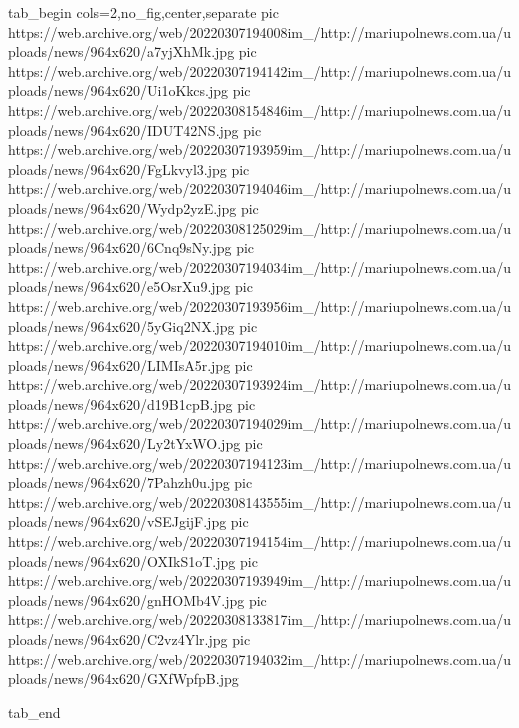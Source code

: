 \ifcmt
  tab_begin cols=2,no_fig,center,separate
		 pic https://web.archive.org/web/20220307194008im_/http://mariupolnews.com.ua/uploads/news/964x620/a7yjXhMk.jpg
		 pic https://web.archive.org/web/20220307194142im_/http://mariupolnews.com.ua/uploads/news/964x620/Ui1oKkcs.jpg
		 pic https://web.archive.org/web/20220308154846im_/http://mariupolnews.com.ua/uploads/news/964x620/IDUT42NS.jpg
		 pic https://web.archive.org/web/20220307193959im_/http://mariupolnews.com.ua/uploads/news/964x620/FgLkvyl3.jpg
		 pic https://web.archive.org/web/20220307194046im_/http://mariupolnews.com.ua/uploads/news/964x620/Wydp2yzE.jpg
		 pic https://web.archive.org/web/20220308125029im_/http://mariupolnews.com.ua/uploads/news/964x620/6Cnq9sNy.jpg
		 pic https://web.archive.org/web/20220307194034im_/http://mariupolnews.com.ua/uploads/news/964x620/e5OsrXu9.jpg
		 pic https://web.archive.org/web/20220307193956im_/http://mariupolnews.com.ua/uploads/news/964x620/5yGiq2NX.jpg
		 pic https://web.archive.org/web/20220307194010im_/http://mariupolnews.com.ua/uploads/news/964x620/LIMIsA5r.jpg
		 pic https://web.archive.org/web/20220307193924im_/http://mariupolnews.com.ua/uploads/news/964x620/d19B1cpB.jpg
		 pic https://web.archive.org/web/20220307194029im_/http://mariupolnews.com.ua/uploads/news/964x620/Ly2tYxWO.jpg
		 pic https://web.archive.org/web/20220307194123im_/http://mariupolnews.com.ua/uploads/news/964x620/7Pahzh0u.jpg
		 pic https://web.archive.org/web/20220308143555im_/http://mariupolnews.com.ua/uploads/news/964x620/vSEJgijF.jpg
		 pic https://web.archive.org/web/20220307194154im_/http://mariupolnews.com.ua/uploads/news/964x620/OXIkS1oT.jpg
		 pic https://web.archive.org/web/20220307193949im_/http://mariupolnews.com.ua/uploads/news/964x620/gnHOMb4V.jpg
		 pic https://web.archive.org/web/20220308133817im_/http://mariupolnews.com.ua/uploads/news/964x620/C2vz4Ylr.jpg
		 pic https://web.archive.org/web/20220307194032im_/http://mariupolnews.com.ua/uploads/news/964x620/GXfWpfpB.jpg

  tab_end
\fi

